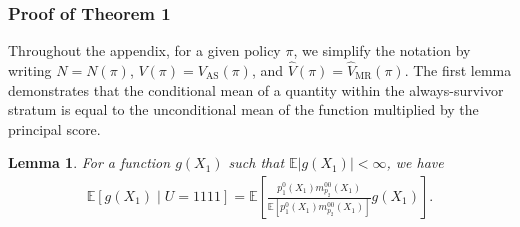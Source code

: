 \documentclass{article}
\newcommand{\wh}{\widehat}
\newcommand{\E}{\mathbb{E}}
\newtheorem{lemma}{Lemma}
\begin{document}
\subsubsection{Proof of Theorem 1}

Throughout the appendix, for a given policy $\pi$, we simplify the notation by writing $N = N(\pi)$, $V(\pi) = V_{\textrm{AS}}(\pi)$, and $\wh V(\pi) = \wh V_{\textrm{MR}}(\pi)$.
The first lemma demonstrates that the conditional mean of a quantity within the always-survivor stratum is equal to the unconditional mean of the function multiplied by the principal score.

	\begin{lemma} \label{lemma:1}
		For a function $g(X_1)$ such that $\mathbb E|g(X_1)| < \infty$, we have
		\begin{align*}
			\E\left[ g(X_1) \mid U=1111 \right] 
			= \E\left[ \frac{ p_1^0(X_1)m_{p_2}^{00}(X_1) }{\E\left[p_1^0(X_1)m_{p_2}^{00}(X_1)\right]} g(X_1) \right].
		\end{align*}
	\end{lemma}
\end{document}
